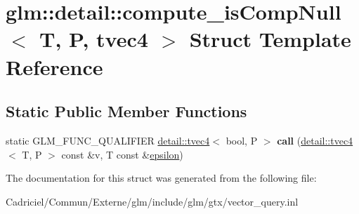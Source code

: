 \hypertarget{structglm_1_1detail_1_1compute__is_comp_null_3_01_t_00_01_p_00_01tvec4_01_4}{}\section{glm\+:\+:detail\+:\+:compute\+\_\+is\+Comp\+Null$<$ T, P, tvec4 $>$ Struct Template Reference}
\label{structglm_1_1detail_1_1compute__is_comp_null_3_01_t_00_01_p_00_01tvec4_01_4}
\subsection*{Static Public Member Functions}
\begin{DoxyCompactItemize}
\item 
static G\+L\+M\+\_\+\+F\+U\+N\+C\+\_\+\+Q\+U\+A\+L\+I\+F\+I\+ER \hyperlink{structglm_1_1detail_1_1tvec4}{detail\+::tvec4}$<$ bool, P $>$ {\bfseries call} (\hyperlink{structglm_1_1detail_1_1tvec4}{detail\+::tvec4}$<$ T, P $>$ const \&v, T const \&\hyperlink{group__gtc__constants_gacb41049b8d22c8aa90e362b96c524feb}{epsilon})\hypertarget{structglm_1_1detail_1_1compute__is_comp_null_3_01_t_00_01_p_00_01tvec4_01_4_a07a877d176273d44a95922243f035ce8}{}\label{structglm_1_1detail_1_1compute__is_comp_null_3_01_t_00_01_p_00_01tvec4_01_4_a07a877d176273d44a95922243f035ce8}

\end{DoxyCompactItemize}


The documentation for this struct was generated from the following file\+:\begin{DoxyCompactItemize}
\item 
Cadriciel/\+Commun/\+Externe/glm/include/glm/gtx/vector\+\_\+query.\+inl\end{DoxyCompactItemize}
